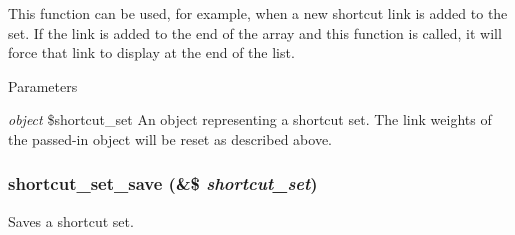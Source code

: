 This function can be used, for example, when a new shortcut link is added to the set. If the link is added to the end of the array and this function is called, it will force that link to display at the end of the list.


\begin{DoxyParams}{Parameters}
\item[{\em object}]\$shortcut\_\-set An object representing a shortcut set. The link weights of the passed-\/in object will be reset as described above. \end{DoxyParams}
\hypertarget{shortcut_8module_acf88aa34dd56330d029cd58ce27abbd7}{
\subsubsection[{shortcut\_\-set\_\-save}]{\setlength{\rightskip}{0pt plus 5cm}shortcut\_\-set\_\-save (\&\$ {\em shortcut\_\-set})}}
\label{shortcut_8module_acf88aa34dd56330d029cd58ce27abbd7}
Saves a shortcut set.


